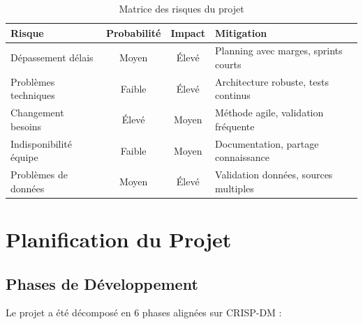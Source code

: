 \documentclass[12pt, a4paper]{report}
\begin{document}
\begin{table}[h]
\centering
\caption{Matrice des risques du projet}
\begin{tabular}{|p{3cm}|c|c|p{4cm}|}
\hline
\textbf{Risque} & \textbf{Probabilité} & \textbf{Impact} & \textbf{Mitigation} \\
\hline
Dépassement délais & Moyen & Élevé & Planning avec marges, sprints courts \\
\hline
Problèmes techniques & Faible & Élevé & Architecture robuste, tests continus \\
\hline
Changement besoins & Élevé & Moyen & Méthode agile, validation fréquente \\
\hline
Indisponibilité équipe & Faible & Moyen & Documentation, partage connaissance \\
\hline
Problèmes de données & Moyen & Élevé & Validation données, sources multiples \\
\hline
\end{tabular}
\end{table}

\section{Planification du Projet}

\subsection{Phases de Développement}

Le projet a été décomposé en 6 phases alignées sur CRISP-DM :
\end{document}
